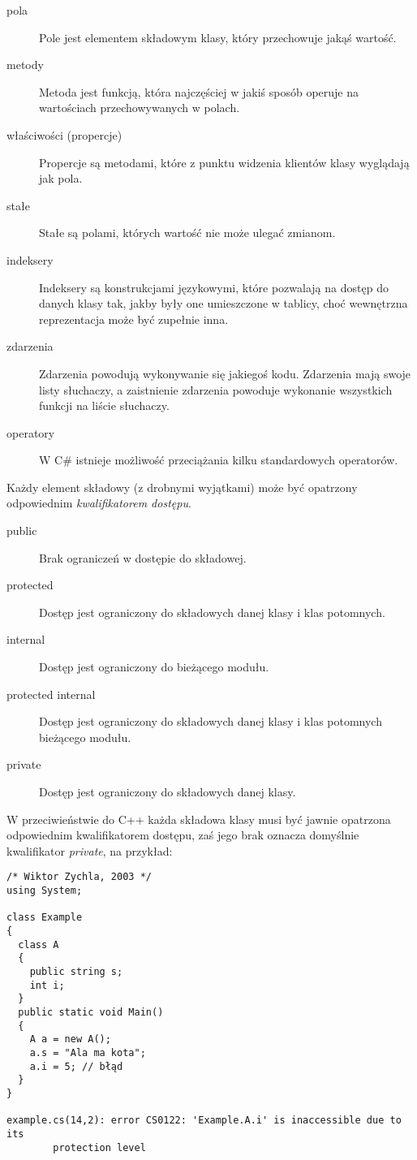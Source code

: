 \begin{description}

\item [pola] Pole jest elementem składowym klasy, który przechowuje jakąś wartość.
\item [metody] Metoda jest funkcją, która najczęściej w jakiś sposób operuje na wartościach przechowywanych
w polach.
\item [właściwości (propercje)] Propercje są metodami, które z punktu widzenia klientów klasy wyglądają jak pola.
\item [stałe] Stałe są polami, których wartość nie może ulegać zmianom.
\item [indeksery] Indeksery są konstrukcjami językowymi, które pozwalają na dostęp do danych klasy tak, jakby
były one umieszczone w tablicy, choć wewnętrzna reprezentacja może być zupełnie inna.
\item [zdarzenia] Zdarzenia powodują wykonywanie się jakiegoś kodu. Zdarzenia mają swoje listy słuchaczy, a
zaistnienie zdarzenia powoduje wykonanie wszystkich funkcji na liście słuchaczy.
\item [operatory] W C\# istnieje możliwość przeciążania kilku standardowych operatorów.

\end{description}

Każdy element składowy (z drobnymi wyjątkami) może być opatrzony odpowiednim {\em kwalifikatorem dostępu}.

\begin{description}

\item [public] Brak ograniczeń w dostępie do składowej.
\item [protected] Dostęp jest ograniczony do składowych danej klasy i klas potomnych.
\item [internal] Dostęp jest ograniczony do bieżącego modułu.
\item [protected internal] Dostęp jest ograniczony do składowych danej klasy i klas potomnych bieżącego modułu.
\item [private] Dostęp jest ograniczony do składowych danej klasy.

\end{description}

W przeciwieństwie do C++ każda składowa klasy musi być jawnie opatrzona odpowiednim kwalifikatorem dostępu, 
zaś jego brak oznacza domyślnie kwalifikator {\em private}, na przykład:

\begin{scriptsize}
\begin{verbatim}
/* Wiktor Zychla, 2003 */
using System;

class Example
{
  class A
  {
    public string s;
    int i;
  }
  public static void Main()
  {
    A a = new A();
    a.s = "Ala ma kota";
    a.i = 5; // błąd
  }
}

example.cs(14,2): error CS0122: 'Example.A.i' is inaccessible due to its
        protection level
\end{verbatim}
\end{scriptsize}

